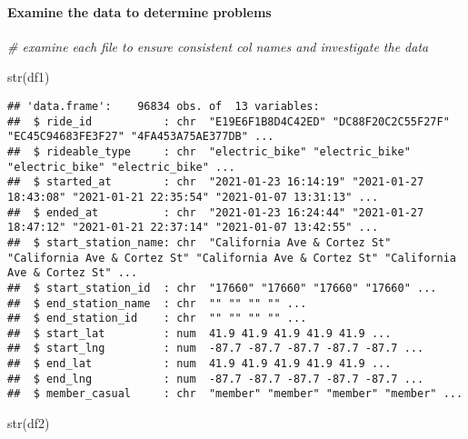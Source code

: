 \documentclass[
]{article}
\newenvironment{Shaded}{\begin{snugshade}}{\end{snugshade}}
\newcommand{\CommentTok}[1]{\textcolor[rgb]{0.56,0.35,0.01}{\textit{#1}}}
\newcommand{\FunctionTok}[1]{\textcolor[rgb]{0.00,0.00,0.00}{#1}}
\newcommand{\NormalTok}[1]{#1}
\begin{document}
\hypertarget{examine-the-data-to-determine-problems}{%
\paragraph{Examine the data to determine
problems}\label{examine-the-data-to-determine-problems}}

\begin{Shaded}
\begin{Highlighting}[]
\CommentTok{\# examine each file to ensure consistent col names and investigate the data }

\FunctionTok{str}\NormalTok{(df1)}
\end{Highlighting}
\end{Shaded}

\begin{verbatim}
## 'data.frame':    96834 obs. of  13 variables:
##  $ ride_id           : chr  "E19E6F1B8D4C42ED" "DC88F20C2C55F27F" "EC45C94683FE3F27" "4FA453A75AE377DB" ...
##  $ rideable_type     : chr  "electric_bike" "electric_bike" "electric_bike" "electric_bike" ...
##  $ started_at        : chr  "2021-01-23 16:14:19" "2021-01-27 18:43:08" "2021-01-21 22:35:54" "2021-01-07 13:31:13" ...
##  $ ended_at          : chr  "2021-01-23 16:24:44" "2021-01-27 18:47:12" "2021-01-21 22:37:14" "2021-01-07 13:42:55" ...
##  $ start_station_name: chr  "California Ave & Cortez St" "California Ave & Cortez St" "California Ave & Cortez St" "California Ave & Cortez St" ...
##  $ start_station_id  : chr  "17660" "17660" "17660" "17660" ...
##  $ end_station_name  : chr  "" "" "" "" ...
##  $ end_station_id    : chr  "" "" "" "" ...
##  $ start_lat         : num  41.9 41.9 41.9 41.9 41.9 ...
##  $ start_lng         : num  -87.7 -87.7 -87.7 -87.7 -87.7 ...
##  $ end_lat           : num  41.9 41.9 41.9 41.9 41.9 ...
##  $ end_lng           : num  -87.7 -87.7 -87.7 -87.7 -87.7 ...
##  $ member_casual     : chr  "member" "member" "member" "member" ...
\end{verbatim}

\begin{Shaded}
\begin{Highlighting}[]
\FunctionTok{str}\NormalTok{(df2)}
\end{Highlighting}
\end{Shaded}
\end{document}
